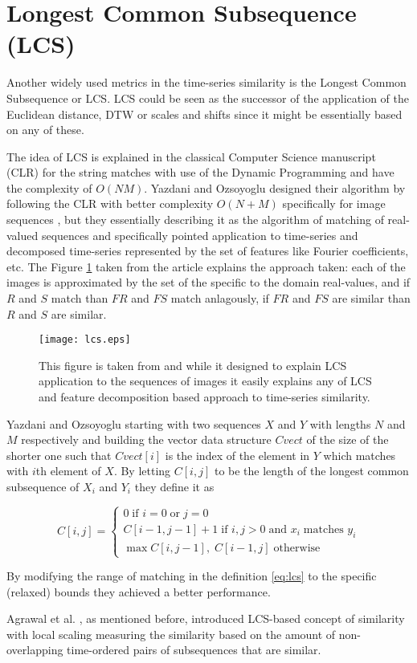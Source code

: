 \section{Longest Common Subsequence (LCS) } \label{lcs}
Another widely used metrics in the time-series similarity is the Longest Common Subsequence or LCS. LCS could be seen as the successor of the application of the Euclidean distance, DTW or scales and shifts \cite{citeulike:3816327} since it might be essentially based on any of these. 

The idea of LCS is explained in the classical Computer Science manuscript \cite{citeulike:180287} (CLR) for the string matches with use of the Dynamic Programming and have the complexity of $O(NM)$. Yazdani and Ozsoyoglu designed their algorithm by following the CLR with better complexity $O(N+M)$ specifically for image sequences \cite{citeulike:4367061}, but they essentially describing it as the algorithm of matching of real-valued sequences and specifically pointed application to time-series and decomposed time-series represented by the set of features like Fourier coefficients, etc. The Figure \ref{fig:lcs} taken from the article explains the approach taken: each of the images is approximated by the set of the specific to the domain real-values, and if $R$ and $S$ match than $FR$ and $FS$ match anlagously, if $FR$ and $FS$ are similar than $R$ and $S$ are similar.

\begin{figure}[tbp]
   \centering
   \texttt{[image: lcs.eps]}
   \caption{This figure is taken from \cite{citeulike:4367061} and while it designed to explain LCS application to the sequences of images it easily explains any of LCS and feature decomposition based approach to time-series similarity.}
   \label{fig:lcs}
\end{figure} 

Yazdani and Ozsoyoglu starting with two sequences $X$ and $Y$ with lengths $N$ and $M$ respectively and building the vector data structure $Cvect$ of the size of the shorter one such that $Cvect[i]$ is the index of the element in $Y$ which matches with $i$th element of $X$. By letting $C[i,j]$ to be the length of the longest common subsequence of $X_{i}$ and $Y_{i}$ they define it as 

\begin{equation}
 C[i,j] = 
 \begin{cases} 
  0 \; \text{if } i=0 \; \text{or} \; j=0 \\
  C[i-1,j-1]+1 \; \text{if } i,j>0 \; \text{and } x_{i} \; \text{matches } y_{i} \\
  \max{C[i,j-1], \;C[i-1,j]} \; \text{otherwise}
 \end{cases}
\label{eq:lcs}
\end{equation}

By modifying the range of matching in the definition \ref{eq:lcs} to the specific (relaxed) bounds they achieved a better performance. 

Agrawal et al. \cite{citeulike:3816327}, as mentioned before, introduced LCS-based concept of similarity with local scaling measuring the similarity based on the amount of non-overlapping time-ordered pairs of subsequences that are similar. 